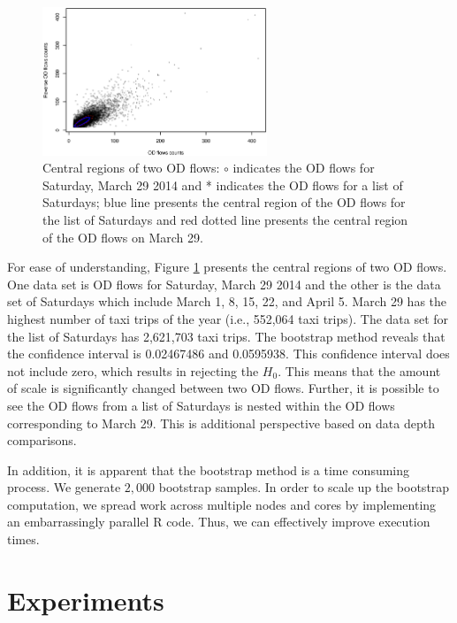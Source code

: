 \documentclass[a4paper,UKenglish]{lipics-v2016}
\begin{document}
\begin{figure}
	\centering
	\includegraphics[width=0.6\textwidth]{images/com_mar_0329.eps}
	\caption{Central regions of two OD flows: $\circ$ indicates the OD flows for Saturday, March 29 2014 and * indicates the OD flows for a list of Saturdays; blue line presents the central region of the OD flows for the list of Saturdays and red dotted line presents the central region of the OD flows on March 29.}
	\label{fig:com_mar_0329}	
\end{figure}

For ease of understanding, Figure \ref{fig:com_mar_0329} presents the central regions of two OD flows. One data set is OD flows for Saturday, March 29 2014 and the other is  the data set of Saturdays which include March  1, 8, 15, 22, and April 5. March 29 has the highest number of taxi trips of the year (i.e., 552,064 taxi trips).  The data set for the list of Saturdays has 2,621,703 taxi trips. The bootstrap method reveals that the confidence interval is 0.02467486 and 0.0595938. This confidence interval does not include zero, which results in rejecting the $H_0$. This means that the amount of scale is significantly changed between two OD flows. Further, it is possible to see the OD flows from a list of Saturdays is nested within the OD flows corresponding to March 29. This is additional perspective based on data depth comparisons. 

In addition, it is apparent that the bootstrap method is a time consuming process. We generate $2,000$ bootstrap samples. In order to scale up the bootstrap computation, we spread work across multiple nodes and cores by implementing an embarrassingly parallel R code.  Thus, we can effectively improve  execution times.



\section{Experiments}
\label{sec:experiments}
\end{document}

